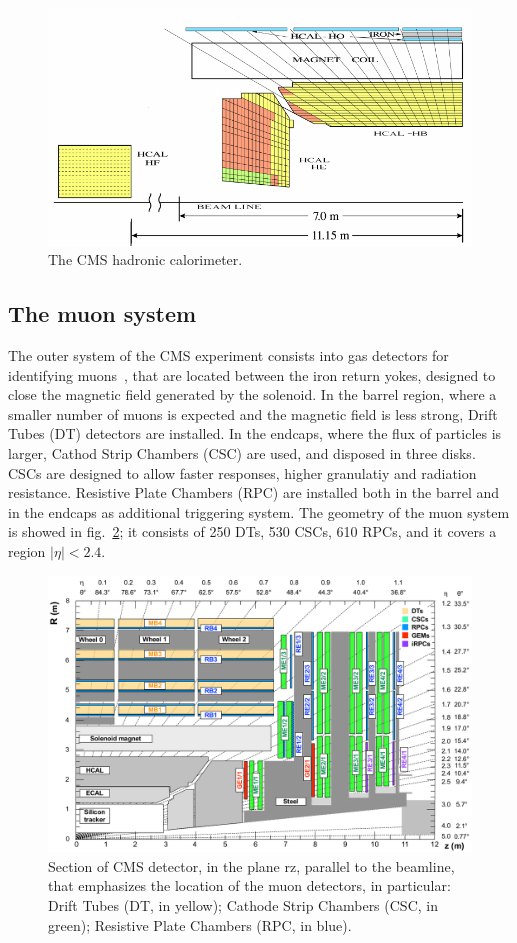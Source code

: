 \begin{figure}[!htb]
  \centering
    \includegraphics[width=.7\textwidth]{figures/cmshcal.png}
  \caption{The CMS hadronic calorimeter.}
  \label{fig:CMS_hcal}
\end{figure}


\subsection{The muon system}


The outer system of the CMS experiment consists into gas detectors for identifying muons~\cite{MUON-TDR}, that are located between the iron return yokes, designed to close the magnetic field generated by the solenoid. In the barrel region, where a smaller number of muons is expected and the magnetic field is less strong, Drift Tubes (DT) detectors are installed. In the endcaps, where the flux of particles is larger, Cathod Strip Chambers (CSC) are used, and disposed in three disks. CSCs are designed to allow faster responses, higher granulatiy and radiation resistance. Resistive Plate Chambers (RPC) are installed both in the barrel and in the endcaps as additional triggering system. The geometry of the muon system is showed in fig.~\ref{fig:CMS_muon}; it consists of 250 DTs, 530 CSCs, 610 RPCs, and it covers a region $|\eta|<2.4$.

\begin{figure}[!htb]
  \centering
    \includegraphics[width=.9\textwidth]{figures/cmsmuon.png}
  \caption{Section of CMS detector, in the plane $\mathrm{rz}$, parallel to the beamline, that emphasizes the location of the muon detectors, in particular: Drift Tubes (DT, in yellow); Cathode Strip Chambers (CSC, in green); Resistive Plate Chambers (RPC, in blue).}
  \label{fig:CMS_muon}
\end{figure}


